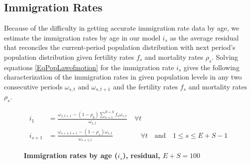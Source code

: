 \documentclass[letterpaper,12pt]{article}
\theoremstyle{definition}
\begin{document}
  \subsection{Immigration Rates}\label{AppPopImm}

    Because of the difficulty in getting accurate immigration rate data by age, we estimate the immigration rates by age in our model $i_s$ as the average residual that reconciles the current-period population distribution with next period's population distribution given fertility rates $f_s$ and mortality rates $\rho_s$. Solving equations \eqref{EqPopLawofmotion} for the immigration rate $i_s$ gives the following characterization of the immigration rates in given population levels in any two consecutive periods $\omega_{s,t}$ and $\omega_{s,t+1}$ and the fertility rates $f_s$ and mortality rates $\rho_s$.

    \begin{equation}\label{EqPopImmRates}
      \begin{split}
        i_1 &= \frac{\omega_{1,t+1} - (1 - \rho_0)\sum_{s=1}^{E+S}f_s\omega_{s,t}}{\omega_{1,t}}\quad\forall t \\
        i_{s+1} &= \frac{\omega_{s+1,t+1} - (1 - \rho_s)\omega_{s,t}}{\omega_{s+1,t}}\qquad\qquad\forall t\quad\text{and}\quad 1\leq s \leq E+S-1
      \end{split}
    \end{equation}

    \begin{figure}[htbp]\centering \captionsetup{width=4.0in}
      \caption{\label{FigImmRates}\textbf{Immigration rates by age ($i_s$), residual, $E+S=100$}}
    \end{figure}
\end{document}
